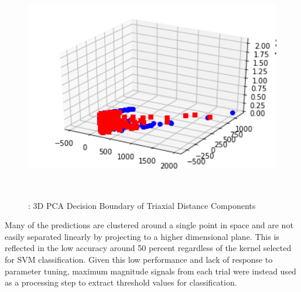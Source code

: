 \documentclass{llncs}
\begin{document}
    
\begin{figure}
	\centering
	\includegraphics[width=12cm, height=10cm]{images/Classification/3D_PCA.png} 
	\caption{: 3D PCA Decision Boundary of Triaxial Distance Components}
	\label{Figure 2: 3D Plot of Linear Kernel SVM with Triaxial Distance Components}
\end{figure}    

	Many of the predictions are clustered around a single point in space and are not easily separated linearly by projecting to a higher dimensional plane. This is reflected in the low accuracy around 50 percent regardless of the kernel selected for SVM classification. Given this low performance and lack of response to parameter tuning, maximum magnitude signals from each trial were instead used as a processing step to extract threshold values for classification.
	
\end{document}
